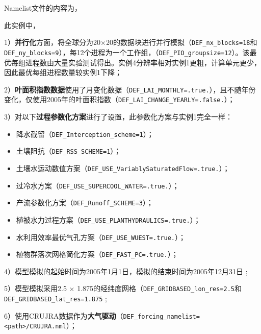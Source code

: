 Namelist文件的内容为，


此实例中，\par
1）\textbf{并行化}方面，将全球分为20\textdegree$\times$20\textdegree 的数据块进行并行模拟（\texttt{DEF\_nx\_blocks=18}和\texttt{DEF\_ny\_blocks=9}），每12个进程为一个工作组，（\texttt{DEF\_PIO\_groupsize=12}）。该最优每组进程数由大量实验测试得出。实例4分辨率相对实例1更粗，计算单元更少，因此最优每组进程数量较实例1下降；\par
2）\textbf{叶面积指数数据}使用了月变化数据（\texttt{DEF\_LAI\_MONTHLY=.true.}），且不随年份变化，仅使用2005年的叶面积指数（\texttt{DEF\_LAI\_CHANGE\_YEARLY=.false.}）；\par

3）对以下\textbf{过程参数化方案}进行了设置，此参数化方案与实例1完全一样：
\begin{itemize}[nosep,leftmargin=4em]
    \item 降水截留（\texttt{DEF\_Interception\_scheme=1}）；
    \item 土壤阻抗（\texttt{DEF\_RSS\_SCHEME=1}）；
    \item 土壤水运动数值方案（\texttt{DEF\_USE\_VariablySaturatedFlow=.true.}）；
    \item 过冷水方案（\texttt{DEF\_USE\_SUPERCOOL\_WATER=.true.}）；
    \item 产流参数化方案（\texttt{DEF\_Runoff\_SCHEME=3}）；
    \item 植被水力过程方案（\texttt{DEF\_USE\_PLANTHYDRAULICS=.true.}）；
    \item 水利用效率最优气孔方案（\texttt{DEF\_USE\_WUEST=.true.}）；
    \item 植物群落次网格简化方案（\texttt{DEF\_FAST\_PC=.true.}）；

\end{itemize}
\par

4）模型模拟的起始时间为2005年1月1日，模拟的结束时间为2005年12月31日 ;\par

5）模型模拟采用2.5 \textdegree $\times$ 1.875\textdegree 的经纬度网格（\texttt{DEF\_GRIDBASED\_lon\_res=2.5}和\texttt{DEF\_GRIDBASED\_lat\_res=1.875} ; \par

6）使用CRUJRA数据作为\textbf{大气驱动}（\texttt{DEF\_forcing\_namelist=<path>/CRUJRA.nml}）；\par


